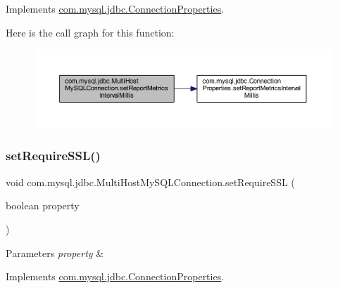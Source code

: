 Implements \mbox{\hyperlink{interfacecom_1_1mysql_1_1jdbc_1_1_connection_properties_a98e28b386c63acdab88d1fdc0531d8ce}{com.\+mysql.\+jdbc.\+Connection\+Properties}}.

Here is the call graph for this function\+:
\nopagebreak
\begin{figure}[H]
\begin{center}
\leavevmode
\includegraphics[width=350pt]{classcom_1_1mysql_1_1jdbc_1_1_multi_host_my_s_q_l_connection_a5b8ccf72b52a8a23618696f6167bbf89_cgraph}
\end{center}
\end{figure}
\mbox{\label{classcom_1_1mysql_1_1jdbc_1_1_multi_host_my_s_q_l_connection_a032636f890a49095b4a3574fa21b2ce8}} 
\subsubsection{\texorpdfstring{set\+Require\+S\+S\+L()}{setRequireSSL()}}
{\footnotesize\ttfamily void com.\+mysql.\+jdbc.\+Multi\+Host\+My\+S\+Q\+L\+Connection.\+set\+Require\+S\+SL (\begin{DoxyParamCaption}\item[{boolean}]{property }\end{DoxyParamCaption})}


\begin{DoxyParams}{Parameters}
{\em property} & \\
\hline
\end{DoxyParams}


Implements \mbox{\hyperlink{interfacecom_1_1mysql_1_1jdbc_1_1_connection_properties_a8ed305ab3368867b5a6cc1cc0bf67ba2}{com.\+mysql.\+jdbc.\+Connection\+Properties}}.

